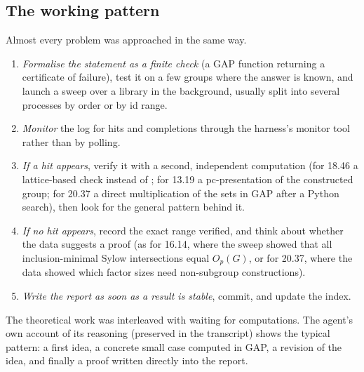 \subsection{The working pattern}
Almost every problem was approached in the same way.
\begin{enumerate}
\item \emph{Formalise the statement as a finite check} (a GAP function  returning a certificate of
failure), test it on a few groups where the answer is known, and launch a sweep over a library in the background,
usually split into several processes by order or by id range.
\item \emph{Monitor} the log for hits and completions through the harness's monitor tool rather than by polling.
\item \emph{If a hit appears}, verify it with a second, independent computation (for 18.46 a lattice-based check
instead of ; for 13.19 a pc-presentation of the constructed group; for 20.37 a direct
multiplication of the sets in GAP after a Python search), then look for the general pattern behind it.
\item \emph{If no hit appears}, record the exact range verified, and think about whether the data suggests a
proof (as for 16.14, where the sweep showed that all inclusion-minimal Sylow intersections equal $O_p(G)$, or for
20.37, where the data showed which factor sizes need non-subgroup constructions).
\item \emph{Write the report as soon as a result is stable}, commit, and update the index.
\end{enumerate}
The theoretical work was interleaved with waiting for computations. The agent's own account of its reasoning
(preserved in the transcript) shows the typical pattern: a first idea, a concrete small case computed in GAP, a
revision of the idea, and finally a proof written directly into the report.

